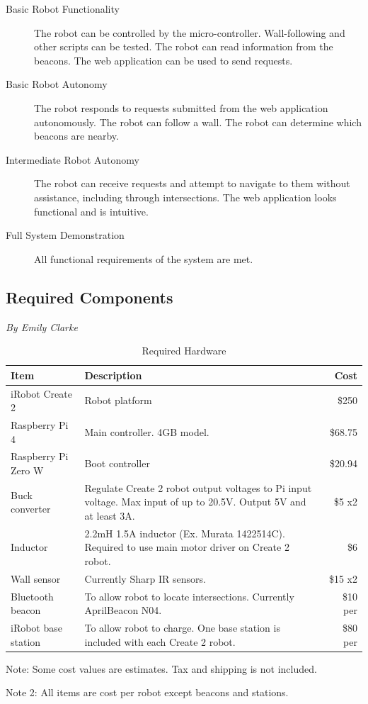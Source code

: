 \documentclass[12pt]{report}
\newcommand{\sectionAuthor}[1]{{\small\vspace{-1em}\textit{#1}}\bigskip\par}
\begin{document}
\begin{description}
   \item[Basic Robot Functionality] The robot can be controlled by the micro-controller. Wall-following and other scripts can be tested. The robot can read information from the beacons. The web application can be used to send requests.
   
  \item[Basic Robot Autonomy] The robot responds to requests submitted from the web application autonomously. The robot can follow a wall. The robot can determine which beacons are nearby.
  
  \item[Intermediate Robot Autonomy] The robot can receive requests and attempt to navigate to them without assistance, including through intersections. The web application looks functional and is intuitive.
   
   \item[Full System Demonstration] All functional requirements of the system are met.
   
\end{description}
\clearpage
\subsection{Required Components}
\sectionAuthor{By Emily Clarke}
\begin{table}[H]
\centering
    \caption{Required Hardware}
    \begin{tabular}{  l  p{8.5cm} r}
        \toprule
\textbf{Item}      
& \textbf{Description} 
& \textbf{Cost} 
\\\hline
iRobot Create 2
& Robot platform
& \$250
\\\hline
Raspberry Pi 4
& Main controller. 4GB model.
& \$68.75
\\\hline
Raspberry Pi Zero W
& Boot controller
& \$20.94
\\\hline
Buck converter
& Regulate Create 2 robot output voltages to Pi input voltage. Max input of up to 20.5V. Output 5V and at least 3A.
& ~\$5 x2
\\\hline
Inductor
& 2.2mH 1.5A inductor (Ex. Murata 1422514C). Required to use main motor driver on Create 2 robot.
& ~\$6
\\\hline
Wall sensor
& Currently Sharp IR sensors.
& \$15 x2
\\\hline
Bluetooth beacon
& To allow robot to locate intersections. Currently AprilBeacon N04.
& \$10 per
\\\hline
iRobot base station
& To allow robot to charge. One base station is included with each Create 2 robot.
& \$80 per
\\
        \bottomrule
    \end{tabular}
    \begin{tablenotes}
      \small
      \centering
      \item Note: Some cost values are estimates. Tax and shipping is not included.
      \item Note 2: All items are cost per robot except beacons and stations.
\end{tablenotes}
\end{table}
\end{document}

